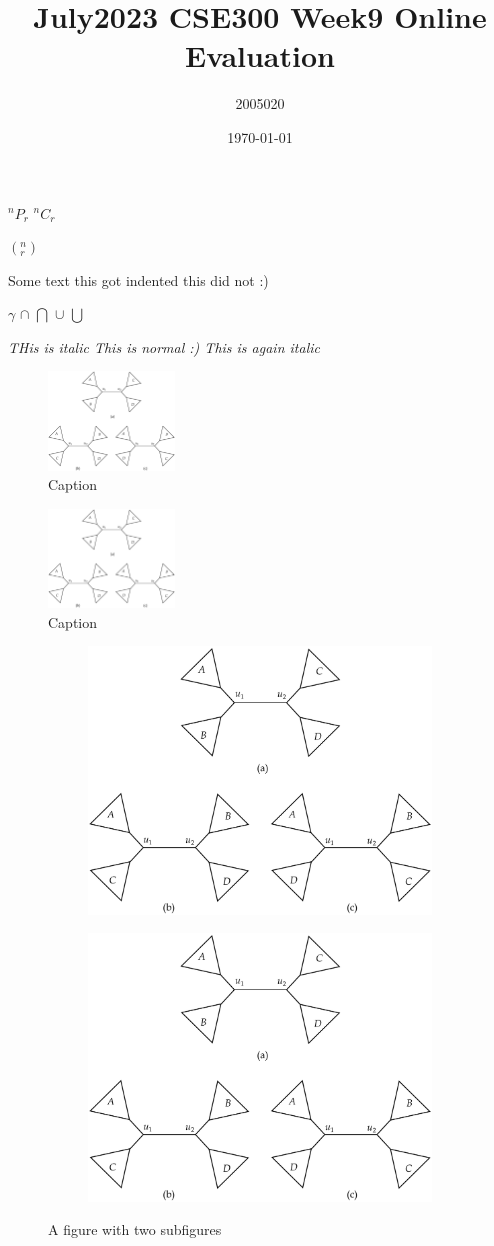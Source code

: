 \documentclass[11pt]{article}
\title{July2023 CSE300 Week9 Online Evaluation}
\author{2005020}
\date{\today}
\begin{document}
\noindent $^nP_r$ $^nC_r$

$( ^n_r ) $ 


\noindent Some text 
this got indented 
 this did not :)

 $\gamma$ $\cap$ $\bigcap$ $\cup$ $\bigcup$

 \textit{THis is italic \emph{This is normal :)} This is again italic}

 \begin{figure}[t]
     \centering
     \includegraphics[width = 0.3\textwidth]{Img/Practice_Problem_4.pdf}
     \caption{Caption}
     \label{fig:enter-label}
 \end{figure}

 \begin{figure}[b]
     \centering
     \includegraphics[width = 0.3\textwidth]{Img/Practice_Problem_4.pdf}
     \caption{Caption}
     \label{fig:enter-label}
 \end{figure}

\begin{figure}
\centering
\begin{subfigure}{.5\textwidth}
  \centering
  \includegraphics[angle=90,width=.4\linewidth]{Img/Practice_Problem_4.pdf}
  \caption{}
  \label{fig:sub1}
\end{subfigure}%
\begin{subfigure}{.5\textwidth}
  \centering
  \includegraphics[angle=-90,width=.4\textwidth]{Img/Practice_Problem_4.pdf}
  \caption{}
  \label{fig:sub2}
\end{subfigure}
\caption{A figure with two subfigures}
\label{fig:test}
\end{figure}
 
\end{document}
